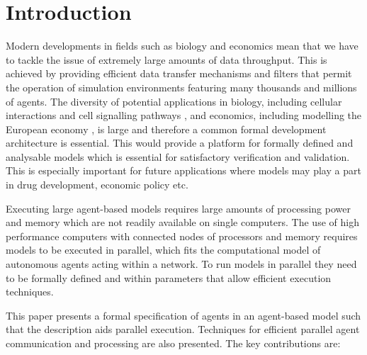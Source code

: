 \documentclass{aamas2009}
\begin{document}
\begin{abstract}
\end{abstract}




\section{Introduction}


Modern developments in fields such as biology and economics mean that we have to
tackle the issue of extremely large amounts of data throughput. This is
achieved by providing efficient data transfer mechanisms and filters that permit the
operation of simulation environments featuring many thousands and millions of
agents. The diversity of potential applications in biology, including cellular
interactions \cite{3,125} and cell signalling pathways \cite{143}, and economics,
including modelling the European economy \cite{eurace01}, is large and therefore
a common formal development architecture is essential. This would provide a
platform for formally defined and analysable models which is essential for
satisfactory verification and validation. This is especially important for future
applications where models may play a part in drug development, economic policy
etc.

Executing large agent-based models requires large amounts of processing power
and memory which are not readily available on single computers. The use of high
performance computers with connected nodes of processors and memory requires
models to be executed in parallel, which fits the computational model of
autonomous agents acting within a network. To run models in
parallel they need to be formally defined and within parameters that allow
efficient execution techniques.



This paper presents a formal specification of agents in an agent-based model
such that the description aids parallel execution. Techniques for efficient
parallel agent communication and processing are also presented. The key
contributions are:
\end{document}
